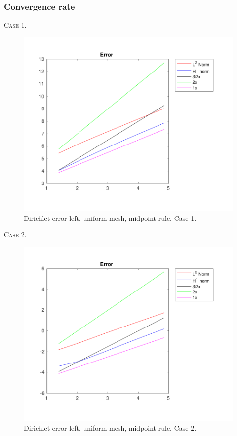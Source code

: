 \documentclass[a4paper]{article}
\numberwithin{equation}{section}
\begin{document}
\subsubsection{Convergence rate}
\noindent\textsc{Case 1.}
\begin{figure}[H]
\centering\includegraphics[width=13.5cm]{fig_dirichlet_error_left_cp_uniform_midpoint_C1_M6}
\caption{Dirichlet error left, uniform mesh, midpoint rule, Case 1.}
\end{figure}
\newpage
\noindent
\textsc{Case 2.}
\begin{figure}[H]
\centering\includegraphics[width=13.5cm]{fig_dirichlet_error_left_cp_uniform_midpoint_C2_M6}
\caption{Dirichlet error left, uniform mesh, midpoint rule, Case 2.}
\end{figure}
\end{document}
